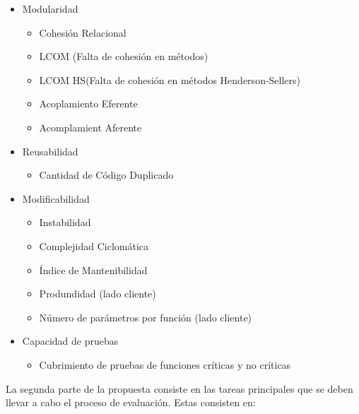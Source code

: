 \documentclass[letterpaper]{article}
\begin{document}
\begin{itemize}
\item Modularidad
	\begin{itemize}
		\item Cohesión Relacional
		\item LCOM (Falta de cohesión en métodos)
		\item LCOM HS(Falta de cohesión en métodos Henderson-Sellers)
		\item Acoplamiento Eferente
		\item Acomplamient Aferente
	\end{itemize}
\item Reusabilidad
	\begin{itemize}
		\item Cantidad de Código Duplicado
	\end{itemize}
\item Modificabilidad
	\begin{itemize}
		\item Instabilidad
		\item Complejidad Ciclomática 
		\item Índice de Mantenibilidad
        \item Produndidad (lado cliente)
        \item Número de parámetros por función (lado cliente)
	\end{itemize}
\item Capacidad de pruebas
	\begin{itemize}
		\item Cubrimiento de pruebas de funciones críticas y no críticas
	\end{itemize}
\end{itemize}

La segunda parte de la propuesta consiste en las tareas principales
que se deben llevar a cabo el proceso de evaluación. Estas consisten en:
\end{document}
